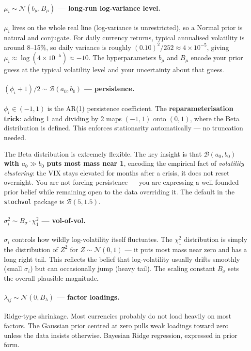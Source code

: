 \documentclass[11pt, a4paper]{article}\usepackage[]{graphicx}\usepackage[]{xcolor}
\newcommand{\stress}[1]{\textbf{#1}}
\newcommand{\term}[1]{\textit{#1}}
\begin{document}
\paragraph{$\mu_i \sim \mathcal{N}(b_\mu, B_\mu)$ --- long-run log-variance level.}
$\mu_i$ lives on the whole real line (log-variance is unrestricted), so a
Normal prior is natural and conjugate.  For daily currency returns, typical
annualised volatility is around 8--15\%, so daily variance is roughly
$(0.10)^2 / 252 \approx 4 \times 10^{-5}$, giving $\mu_i \approx \log(4 \times
10^{-5}) \approx -10$.  The hyperparameters $b_\mu$ and $B_\mu$ encode your
prior guess at the typical volatility level and your uncertainty about that
guess.

\paragraph{$({\phi_i + 1})/{2} \sim \mathcal{B}(a_0, b_0)$ --- persistence.}
$\phi_i \in (-1, 1)$ is the AR(1) persistence coefficient.  The
\stress{reparameterisation trick}: adding 1 and dividing by 2 maps $(-1,1)$
onto $(0,1)$, where the Beta distribution is defined.  This enforces
stationarity automatically --- no truncation needed.

The Beta distribution is extremely flexible.  The key insight is that
\stress{$\mathcal{B}(a_0, b_0)$ with $a_0 \gg b_0$ puts most mass near 1},
encoding the empirical fact of \term{volatility clustering}: the VIX stays
elevated for months after a crisis, it does not reset overnight.  You are not
forcing persistence --- you are expressing a well-founded prior belief while
remaining open to the data overriding it.  The default in the
\texttt{stochvol} package is $\mathcal{B}(5, 1.5)$.

\paragraph{$\sigma_i^2 \sim B_\sigma \cdot \chi^2_1$ --- vol-of-vol.}
$\sigma_i$ controls how wildly log-volatility itself fluctuates.  The
$\chi^2_1$ distribution is simply the distribution of $Z^2$ for
$Z \sim \mathcal{N}(0,1)$ --- it puts most mass near zero and has a long right
tail.  This reflects the belief that log-volatility usually drifts smoothly
(small $\sigma_i$) but can occasionally jump (heavy tail).  The scaling
constant $B_\sigma$ sets the overall plausible magnitude.

\paragraph{$\lambda_{ij} \sim \mathcal{N}(0, B_\lambda)$ --- factor loadings.}
Ridge-type shrinkage.  Most currencies probably do not load heavily on most
factors.  The Gaussian prior centred at zero pulls weak loadings toward zero
unless the data insists otherwise.  Bayesian Ridge regression, expressed in
prior form.
\end{document}
